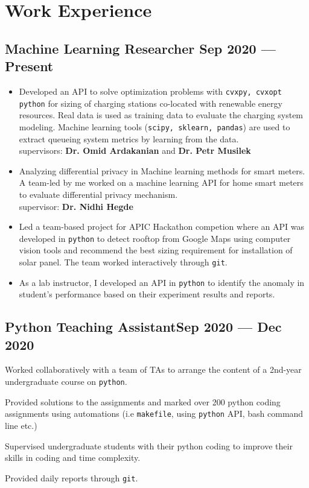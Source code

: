 \documentclass[letter,10pt]{article}
\begin{document}
\section{Work Experience}
\subsection{{Machine Learning Researcher \hfill Sep 2020 --- Present}}
\begin{itemize}
\item Developed an API to solve optimization problems with \texttt{cvxpy, cvxopt python} for sizing of charging stations co-located with renewable energy resources. Real data is used as training data to evaluate the charging system modeling. Machine learning tools (\texttt{scipy, sklearn, pandas}) are used to extract queueing system metrics by learning from  the data.\\
supervisors: \textbf{Dr. Omid Ardakanian} and \textbf{Dr. Petr Musilek}
\item Analyzing differential privacy in Machine learning methods for smart meters. A team-led by me worked on a machine learning API for home smart meters to evaluate differential privacy mechanism.\\
supervisor: \textbf{Dr. Nidhi Hegde}

\item Led a team-based project for APIC Hackathon competion where an API was developed in \texttt{python} to detect rooftop from Google Maps using computer vision tools and recommend the best sizing requirement for installation of solar panel. The team worked interactively through \texttt{git}.

\item As a lab instructor, I developed an API in \texttt{python} to identify the anomaly in student's performance based on their experiment results and reports. 
\end{itemize}

\subsection{{Python Teaching Assistant\hfill Sep 2020 --- Dec 2020}}
\begin{zitemize}
	\item Worked collaboratively with a team of TAs to arrange the content of a 2nd-year undergraduate course on \texttt{python}.
	\item Provided solutions to the assignments and marked over 200 python coding assignments using automations (i.e \texttt{makefile}, using \texttt{python} API, bash command line etc.)
	\item Supervised undergraduate students with their python coding to improve their skills in coding and time complexity.
	\item Provided daily reports through \texttt{git}.
\end{zitemize}
\end{document}
